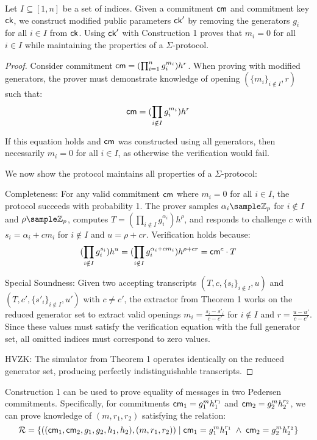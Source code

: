\begin{corollary}
    Let $I \subseteq [1,n]$ be a set of indices. Given a commitment $\mathsf{cm}$ and commitment key $\mathsf{ck}$, we construct modified public parameters $\mathsf{ck}'$ by removing the generators $g_i$ for all $i \in I$ from $\mathsf{ck}$. Using $\mathsf{ck}'$ with Construction 1 proves that $m_i = 0$ for all $i \in I$ while maintaining the properties of a $\Sigma$-protocol.
\end{corollary}

\begin{proof}
    Consider commitment $\mathsf{cm} = (\prod_{i=1}^n g_i^{m_i})h^r$. When proving with modified generators, the prover must demonstrate knowledge of opening $(\{m_i\}_{i \notin I}, r)$ such that:
    \[
    \mathsf{cm} = (\prod_{i \notin I} g_i^{m_i})h^r
    \]
    
    If this equation holds and $\mathsf{cm}$ was constructed using all generators, then necessarily $m_i = 0$ for all $i \in I$, as otherwise the verification would fail.

    We now show the protocol maintains all properties of a $\Sigma$-protocol:

    Completeness: For any valid commitment $\mathsf{cm}$ where $m_i = 0$ for all $i \in I$, the protocol succeeds with probability 1. The prover samples $\alpha_i \sample \Z_p$ for $i \notin I$ and $\rho \sample \Z_p$, computes $T = (\prod_{i \notin I} g_i^{\alpha_i})h^{\rho}$, and responds to challenge $c$ with $s_i = \alpha_i + cm_i$ for $i \notin I$ and $u = \rho + cr$. Verification holds because:
    \[
    (\prod_{i \notin I} g_i^{s_i})h^u = (\prod_{i \notin I} g_i^{\alpha_i + cm_i})h^{\rho + cr} = \mathsf{cm}^c \cdot T
    \]

    Special Soundness: Given two accepting transcripts $(T, c, \{s_i\}_{i \notin I}, u)$ and $(T, c', \{s'_i\}_{i \notin I}, u')$ with $c \neq c'$, the extractor from Theorem 1 works on the reduced generator set to extract valid openings $m_i = \frac{s_i-s'_i}{c-c'}$ for $i \notin I$ and $r = \frac{u-u'}{c-c'}$. Since these values must satisfy the verification equation with the full generator set, all omitted indices must correspond to zero values.

    HVZK: The simulator from Theorem 1 operates identically on the reduced generator set, producing perfectly indistinguishable transcripts.
\end{proof}



\begin{corollary}
    Construction 1 can be used to prove equality of messages in two Pedersen commitments. Specifically, for commitments $\mathsf{cm}_1 = g_1^m h_1^{r_1}$ and $\mathsf{cm}_2 = g_2^m h_2^{r_2}$, we can prove knowledge of $(m, r_1, r_2)$ satisfying the relation:
    \[
    \mathcal{R} = \left\{ ((\mathsf{cm}_1, \mathsf{cm}_2, g_1, g_2, h_1, h_2), (m,r_1,r_2)) \; | \; \mathsf{cm}_1 = g_1^{m}h_1^{r_1} \; \wedge \; \mathsf{cm}_2 = g_2^{m}h_2^{r_2} \right\}
    \]    
\end{corollary}

